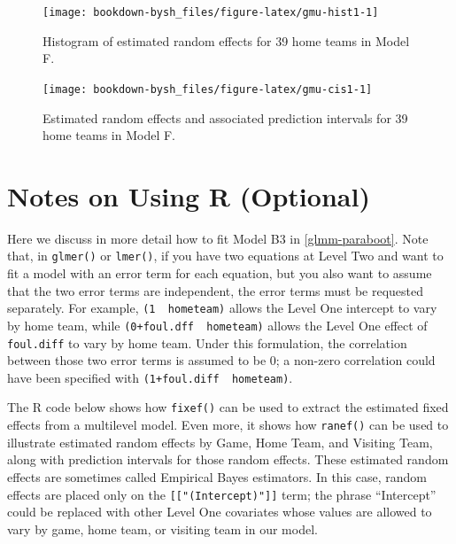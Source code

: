 \documentclass[
]{krantz}
\begin{document}
\begin{figure}

{\centering \texttt{[image: bookdown-bysh\_files/figure-latex/gmu-hist1-1]} 

}

\caption{Histogram of estimated random effects for 39 home teams in Model F.}\label{fig:gmu-hist1}
\end{figure}

\begin{figure}

{\centering \texttt{[image: bookdown-bysh\_files/figure-latex/gmu-cis1-1]} 

}

\caption{Estimated random effects and associated prediction intervals for 39 home teams in Model F.}\label{fig:gmu-cis1}
\end{figure}

\hypertarget{usingR-glmm}{%
\section{Notes on Using R (Optional)}\label{usingR-glmm}}

Here we discuss in more detail how to fit Model B3 in \ref{glmm-paraboot}. Note that, in \texttt{glmer()} or \texttt{lmer()}, if you have two equations at Level Two and want to fit a model with an error term for each equation, but you also want to assume that the two error terms are independent, the error terms must be requested separately. For example, \texttt{(1\ \textbar{}\ hometeam)} allows the Level One intercept to vary by home team, while \texttt{(0+foul.dff\ \textbar{}\ hometeam)} allows the Level One effect of \texttt{foul.diff} to vary by home team. Under this formulation, the correlation between those two error terms is assumed to be 0; a non-zero correlation could have been specified with \texttt{(1+foul.diff\ \textbar{}\ hometeam)}.

The R code below shows how \texttt{fixef()} can be used to extract the estimated fixed effects from a multilevel model. Even more, it shows how \texttt{ranef()} can be used to illustrate estimated random effects by Game, Home Team, and Visiting Team, along with prediction intervals for those random effects. These estimated random effects are sometimes called Empirical Bayes estimators. In this case, random effects are placed only on the \texttt{{[}{[}"(Intercept)"{]}{]}} term; the phrase ``Intercept'' could be replaced with other Level One covariates whose values are allowed to vary by game, home team, or visiting team in our model.
\end{document}
